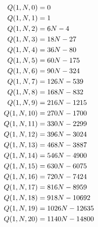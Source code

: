 ﻿\begin{align*}
    {Q}(1,N,0) &= 0 \\
    {Q}(1,N,1) &= 1 \\
    {Q}(1,N,2) &= 6N - 4 \\
    {Q}(1,N,3) &= 18N - 27 \\
    {Q}(1,N,4) &= 36N - 80 \\
    {Q}(1,N,5) &= 60N - 175 \\
    {Q}(1,N,6) &= 90N - 324 \\
    {Q}(1,N,7) &= 126N - 539 \\
    {Q}(1,N,8) &= 168N - 832 \\
    {Q}(1,N,9) &= 216N - 1215 \\
    {Q}(1,N,10) &= 270N - 1700 \\
    {Q}(1,N,11) &= 330N - 2299 \\
    {Q}(1,N,12) &= 396N - 3024 \\
    {Q}(1,N,13) &= 468N - 3887 \\
    {Q}(1,N,14) &= 546N - 4900 \\
    {Q}(1,N,15) &= 630N - 6075 \\
    {Q}(1,N,16) &= 720N - 7424 \\
    {Q}(1,N,17) &= 816N - 8959 \\
    {Q}(1,N,18) &= 918N - 10692 \\
    {Q}(1,N,19) &= 1026N - 12635 \\
    {Q}(1,N,20) &= 1140N - 14800
\end{align*}

